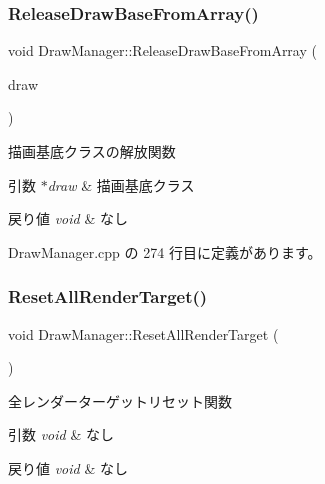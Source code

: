 \subsubsection{\texorpdfstring{Release\+Draw\+Base\+From\+Array()}{ReleaseDrawBaseFromArray()}}
{\footnotesize\ttfamily void Draw\+Manager\+::\+Release\+Draw\+Base\+From\+Array (\begin{DoxyParamCaption}\item[{\mbox{\hyperlink{class_draw_base}{Draw\+Base}} $\ast$}]{draw }\end{DoxyParamCaption})}



描画基底クラスの解放関数 


\begin{DoxyParams}{引数}
{\em $\ast$draw} & 描画基底クラス \\
\hline
\end{DoxyParams}

\begin{DoxyRetVals}{戻り値}
{\em void} & なし \\
\hline
\end{DoxyRetVals}


 Draw\+Manager.\+cpp の 274 行目に定義があります。

\mbox{\label{class_draw_manager_a20787acc9c5a096e80651dc1909ae60d}} 
\subsubsection{\texorpdfstring{Reset\+All\+Render\+Target()}{ResetAllRenderTarget()}}
{\footnotesize\ttfamily void Draw\+Manager\+::\+Reset\+All\+Render\+Target (\begin{DoxyParamCaption}{ }\end{DoxyParamCaption})\hspace{0.3cm}{\ttfamily [private]}}



全レンダーターゲットリセット関数 


\begin{DoxyParams}{引数}
{\em void} & なし \\
\hline
\end{DoxyParams}

\begin{DoxyRetVals}{戻り値}
{\em void} & なし \\
\hline
\end{DoxyRetVals}


